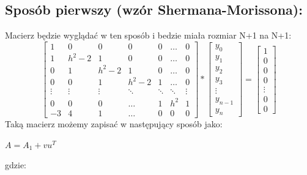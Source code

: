 \documentclass[12pt]{article}
\begin{document}
\subsection{Sposób pierwszy (wzór Shermana-Morissona):}
Macierz będzie wyglądać w ten sposób i bedzie miała rozmiar N+1 na N+1:
\[
\begin{bmatrix}
    1 & 0 & 0 & 0 & 0 & \dots & 0\\
    1 & h^{2}-2 & 1 & 0 & 0 & \dots & 0\\ 
    0 & 1 & h^{2}-2 & 1 & 0 & \dots & 0\\
    0 & 0 & 1 & h^{2}-2 & 1 &\dots & 0\\
    \vdots & \vdots & \vdots & \ddots & \ddots & \ddots & \vdots\\
    0 & 0 & 0 & \hdots & 1 & h^{2} & 1\\
    -3 & 4 & 1 & \hdots & 0 & 0 & 0
\end{bmatrix}
*
\begin{bmatrix}
    y_{0}\\
    y_{1}\\
    y_{2}\\
    y_{3}\\
    \vdots\\
    y_{n-1}\\
    y_{n}
\end{bmatrix}
=
\begin{bmatrix}
    1\\
    0\\
    0\\
    0\\
    \vdots\\
    0\\
    0
\end{bmatrix}
\]
Taką macierz możemy zapisać w następujący sposób jako:
\begin{center}
    $ A = A_{1} + vu^{T}$
\end{center}
gdzie:
\end{document}

